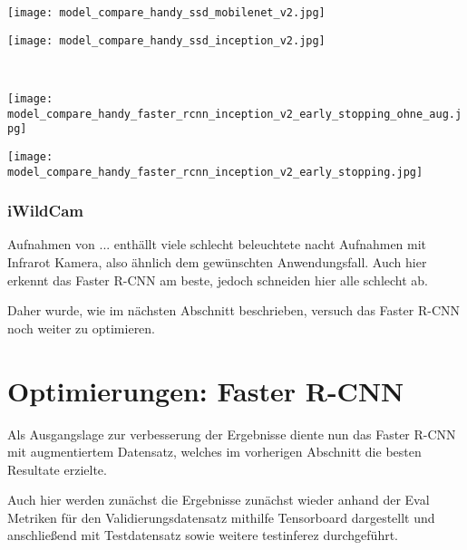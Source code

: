\begin{minipage}{0.5\textwidth}
  \centering
  \texttt{[image: model\_compare\_handy\_ssd\_mobilenet\_v2.jpg]}
  \label{}
\end{minipage}
\begin{minipage}{0.5\textwidth}
  \centering
  \texttt{[image: model\_compare\_handy\_ssd\_inception\_v2.jpg]}
  \label{}
\end{minipage}
\\[1cm]
\begin{minipage}{0.5\textwidth}
  \centering
  \texttt{[image: model\_compare\_handy\_faster\_rcnn\_inception\_v2\_early\_stopping\_ohne\_aug.jpg]}
  \label{}
\end{minipage}
\begin{minipage}{0.5\textwidth}
  \centering
  \texttt{[image: model\_compare\_handy\_faster\_rcnn\_inception\_v2\_early\_stopping.jpg]}
  \label{}
\end{minipage}


\subsubsection{iWildCam}

Aufnahmen von ... enthällt viele schlecht beleuchtete nacht Aufnahmen 
mit Infrarot Kamera, also ähnlich dem gewünschten Anwendungsfall.
Auch hier erkennt das Faster R-CNN am beste, jedoch 
schneiden hier alle schlecht ab.

Daher wurde, wie im nächsten Abschnitt beschrieben, versuch
das Faster R-CNN noch weiter zu optimieren.


\section{Optimierungen: Faster R-CNN}\label{sec:optimierung_faster_rcnn}


Als Ausgangslage zur verbesserung der Ergebnisse diente 
nun das Faster R-CNN mit augmentiertem Datensatz, welches 
im vorherigen Abschnitt die besten Resultate erzielte.

Auch hier werden zunächst die Ergebnisse zunächst wieder 
anhand der Eval Metriken für den Validierungsdatensatz mithilfe Tensorboard 
dargestellt und anschließend mit Testdatensatz sowie weitere testinferez 
durchgeführt.





